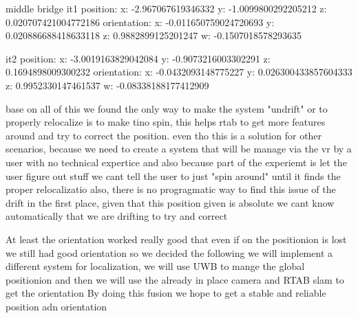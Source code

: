     middle bridge
    it1
    position:
      x: -2.967067619346332
      y: -1.0099800292205212
      z: 0.020707421004772186
    orientation:
      x: -0.011650759024720693
      y: 0.020886688418633118
      z: 0.9882899125201247
      w: -0.1507018578293635

      it2
          position:
      x: -3.0019163829042084
      y: -0.9073216003302291
      z: 0.1694898009300232
    orientation:
      x: -0.0432093148775227
      y: 0.026300433857604333
      z: 0.9952330147461537
      w: -0.08338188177412909


base on all of this we found the only way to make the system "undrift" or to properly relocalize is to make tino spin, this helps rtab to get more features around and try to correct the position.
even tho this is a solution for other scenarios, because we need to create a system that will be manage via the vr by a user with no technical expertice and also because part of the experiemt is let the user figure out stuff we cant tell the user to just "spin around" until it finds the proper relocalizatio
also, there is no progragmatic way to find this issue of the drift in the first place, given that this position given is absolute we cant know automatically that we are drifting to try and correct

At least the orientation worked really good that even if on the positionion is lost we still had good orientation so we decided the following
we will implement a different system for localization, we will use UWB to mange the global positionion and then we will use the already in place camera and RTAB slam to get the orientation
By doing this fusion we hope to get a stable and reliable position adn orientation
